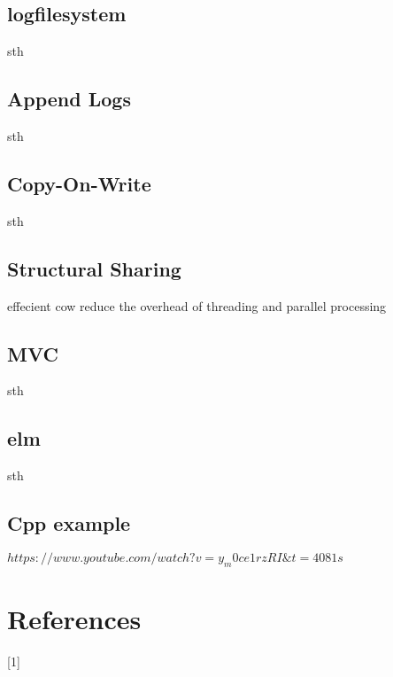 \documentclass[conference]{IEEEtran}
\begin{document}
\subsection{logfilesystem}
sth
\subsection{Append Logs}
sth
\subsection{Copy-On-Write}
sth
\subsection{Structural Sharing}
effecient cow reduce the overhead of threading and parallel processing
\subsection{MVC}
sth
\subsection{elm}
sth
\subsection{Cpp example}
$https://www.youtube.com/watch?v=y_m0ce1rzRI\&t=4081s$
\section*{References}
[1] 



\end{document}
